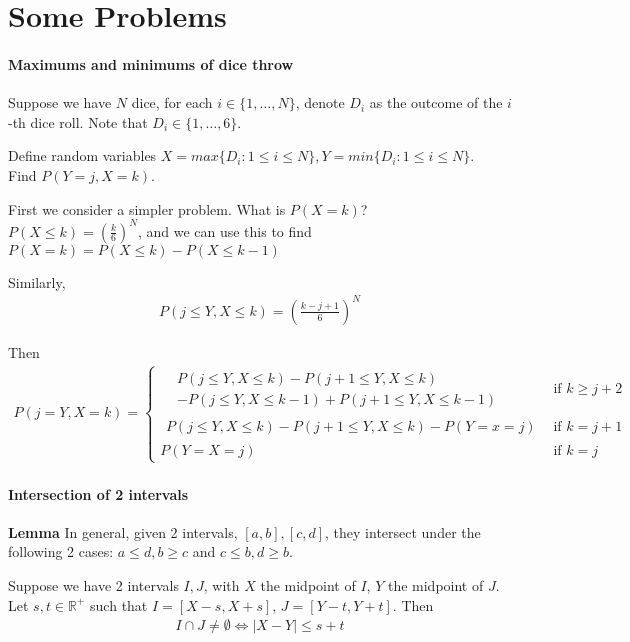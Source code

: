 \documentclass{article}
\begin{document}
\section{Some Problems}
\paragraph{Maximums and minimums of dice throw}
Suppose we have $N$ dice, for each $i\in \{1,\dots,N\}$, denote $D_i$ as the outcome of the $i$-th dice roll. Note that $D_i\in \{1,\dots, 6\}$.

Define random variables $X=max\{D_i:1\leq i\leq N\}, Y=min\{D_i:1\leq i\leq N\}$.\\
Find $P(Y=j, X=k)$.

First we consider a simpler problem. What is $P(X=k)$?\\
$P(X\leq k)=(\frac{k}{6})^N$, and we can use this to find $P(X=k)=P(X\leq k) - P(X\leq k-1)$

Similarly, 
\begin{align*}
	P(j\leq Y, X\leq k)=(\frac{k-j+1}{6})^N
\end{align*}

Then 
\begin{align*}
	P(j=Y, X=k) = 
	\begin{cases}
	\begin{aligned}
	&P(j\leq Y, X\leq k) - P(j+1\leq Y, X\leq k) \\
	&- P(j\leq Y, X\leq k-1) + P(j+1\leq Y, X\leq k-1)
	\end{aligned} &\text{if } k\geq j+2\\
	\begin{aligned}
	P(j\leq Y, X\leq k) - P(j+1\leq Y, X\leq k) - P(Y=x=j)
	\end{aligned} &\text{if } k=j+1\\
	P(Y=X=j) &\text{if } k=j
	\end{cases}
\end{align*}


\paragraph{Intersection of 2 intervals}
\textbf{Lemma} In general, given 2 intervals, $[a,b],[c,d]$, they intersect under the following 2 cases:
$a \leq d, b \geq c$ and $c\leq b, d\geq b$.


Suppose we have 2 intervals $I,J$, with $X$ the midpoint of $I$, $Y$ the midpoint of $J$. Let $s,t\in \mathbb{R}^+$ such that $I=[X-s,X+s]$, $J=[Y-t,Y+t]$. Then 
\begin{align*}
	I\cap J\neq \emptyset \iff |X-Y| \leq s+t
\end{align*}
\end{document}
